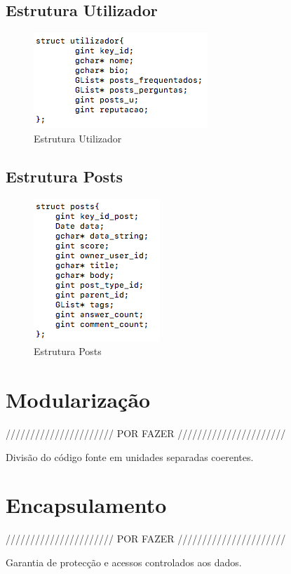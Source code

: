 \documentclass[a4paper]{article}
\begin{document}
\subsection{Estrutura Utilizador}
\begin{figure}[ht]
\centering
\includegraphics[scale=0.50]{image_utilizador}
\caption{Estrutura Utilizador} 
\label{img:utilizador}
\end{figure}

\subsection{Estrutura Posts}
\begin{figure}[ht]
\centering
\includegraphics[scale=0.50]{image_posts}
\caption{Estrutura Posts} 
\label{img:posts}
\end{figure}

\section{Modularização}
\label{sec:modularizacao}

////////////////////// POR FAZER //////////////////////

Divisão do código fonte em unidades separadas coerentes.

\section{Encapsulamento}

////////////////////// POR FAZER //////////////////////

Garantia de protecção e acessos controlados aos dados.
\end{document}
